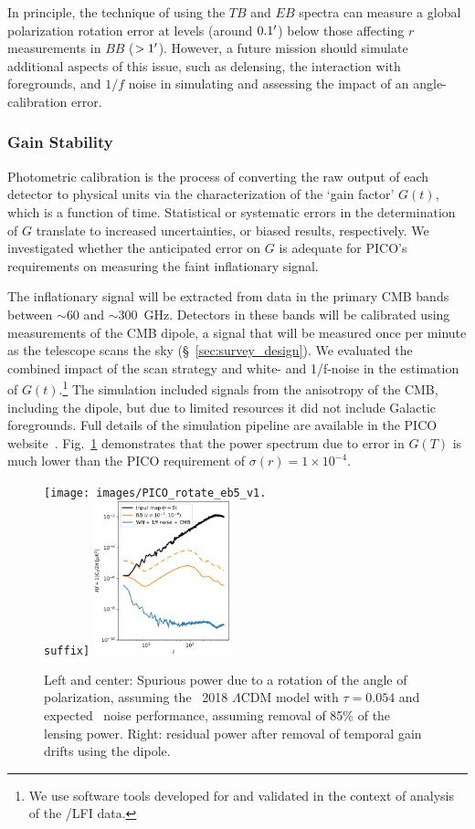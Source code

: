 \documentclass[PICOReport.tex]{subfiles}
\begin{document}
In principle, the technique of using the $TB$ and $EB$ spectra can measure a global polarization rotation error at levels (around $0.1 '$) below those affecting $r$ measurements in $BB$ ($> 1 '$).  However, a future mission should simulate additional aspects of this issue, such as delensing, the interaction with foregrounds, and $1/f$ noise in simulating and assessing the impact of an angle-calibration error.

\subsubsection{Gain Stability}
\label{sec:gain_stability}


Photometric calibration is the process of converting the raw output of each detector to physical units via the characterization of the `gain factor' $G(t)$, which is a function of time. Statistical or systematic errors in the determination of $G$ translate to increased uncertainties, or biased results, respectively.  We investigated whether the anticipated error on $G$ is adequate for PICO's requirements on measuring the faint inflationary signal.  

The inflationary signal will be extracted from data in the primary CMB bands between $\sim$60 and $\sim$300~GHz. Detectors in these bands will be calibrated using measurements of the CMB dipole, a signal that will be measured once per minute as the telescope scans the sky (\S~\ref{sec:survey_design}).  We evaluated the combined impact of the scan strategy and white- and 1/f-noise in the estimation of $G(t)$.\footnote{We use software tools developed for and validated in the context of analysis of the \planck/LFI data.} The simulation included signals from the anisotropy of the CMB, including the dipole, but due to limited resources it did not include Galactic foregrounds. Full details of the simulation pipeline are available in the PICO website~\citep{pico_web}. Fig.~\ref{fig:rot_bb_tb_eb} demonstrates that the power spectrum due to error in $G(T)$ is much lower than the PICO requirement of $\sigma(r) = 1\times 10^{-4}$. 
\begin{figure}[thb]
\texttt{[image: images/PICO\_rotate\_eb5\_v1.\\suffix]} 
\includegraphics[width=0.35\textwidth]{images/calibration_spectrum_BB.pdf}
\caption{\captiontext
Left and center: Spurious power due to a rotation of the angle of polarization, assuming the \planck~2018 $\Lambda$CDM model \citep{Planck2018_VI} with $\tau=0.054$ and expected \pico\ noise performance, assuming removal of 85\% of the lensing power.  Right: residual power after removal of temporal gain drifts using the dipole.
\label{fig:rot_bb_tb_eb} }
\end{figure}
\end{document}

